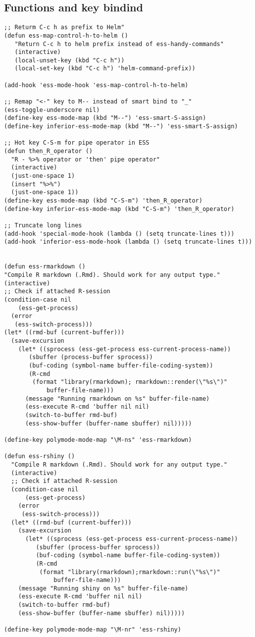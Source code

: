 \documentclass[11pt]{article}
\begin{document}
\subsection{Functions and key bindind}
\label{sec:org496447f}
\begin{verbatim}
;; Returm C-c h as prefix to Helm"
(defun ess-map-control-h-to-helm ()
   "Return C-c h to helm prefix instead of ess-handy-commands"
   (interactive)
   (local-unset-key (kbd "C-c h"))
   (local-set-key (kbd "C-c h") 'helm-command-prefix))

(add-hook 'ess-mode-hook 'ess-map-control-h-to-helm)

;; Remap "<-" key to M-- instead of smart bind to "_"
(ess-toggle-underscore nil)
(define-key ess-mode-map (kbd "M--") 'ess-smart-S-assign)
(define-key inferior-ess-mode-map (kbd "M--") 'ess-smart-S-assign)

;; Hot key C-S-m for pipe operator in ESS
(defun then_R_operator ()
  "R - %>% operator or 'then' pipe operator"
  (interactive)
  (just-one-space 1)
  (insert "%>%")
  (just-one-space 1))
(define-key ess-mode-map (kbd "C-S-m") 'then_R_operator)
(define-key inferior-ess-mode-map (kbd "C-S-m") 'then_R_operator)

;; Truncate long lines
(add-hook 'special-mode-hook (lambda () (setq truncate-lines t)))
(add-hook 'inferior-ess-mode-hook (lambda () (setq truncate-lines t)))


(defun ess-rmarkdown ()
"Compile R markdown (.Rmd). Should work for any output type."
(interactive)
;; Check if attached R-session
(condition-case nil
    (ess-get-process)
  (error
   (ess-switch-process)))
(let* ((rmd-buf (current-buffer)))
  (save-excursion
    (let* ((sprocess (ess-get-process ess-current-process-name))
	   (sbuffer (process-buffer sprocess))
	   (buf-coding (symbol-name buffer-file-coding-system))
	   (R-cmd
	    (format "library(rmarkdown); rmarkdown::render(\"%s\")"
		    buffer-file-name)))
      (message "Running rmarkdown on %s" buffer-file-name)
      (ess-execute R-cmd 'buffer nil nil)
      (switch-to-buffer rmd-buf)
      (ess-show-buffer (buffer-name sbuffer) nil)))))

(define-key polymode-mode-map "\M-ns" 'ess-rmarkdown)

(defun ess-rshiny ()
  "Compile R markdown (.Rmd). Should work for any output type."
  (interactive)
  ;; Check if attached R-session
  (condition-case nil
      (ess-get-process)
    (error
     (ess-switch-process)))
  (let* ((rmd-buf (current-buffer)))
    (save-excursion
      (let* ((sprocess (ess-get-process ess-current-process-name))
	     (sbuffer (process-buffer sprocess))
	     (buf-coding (symbol-name buffer-file-coding-system))
	     (R-cmd
	      (format "library(rmarkdown);rmarkdown::run(\"%s\")"
		      buffer-file-name)))
	(message "Running shiny on %s" buffer-file-name)
	(ess-execute R-cmd 'buffer nil nil)
	(switch-to-buffer rmd-buf)
	(ess-show-buffer (buffer-name sbuffer) nil)))))

(define-key polymode-mode-map "\M-nr" 'ess-rshiny)

\end{verbatim}
\end{document}
